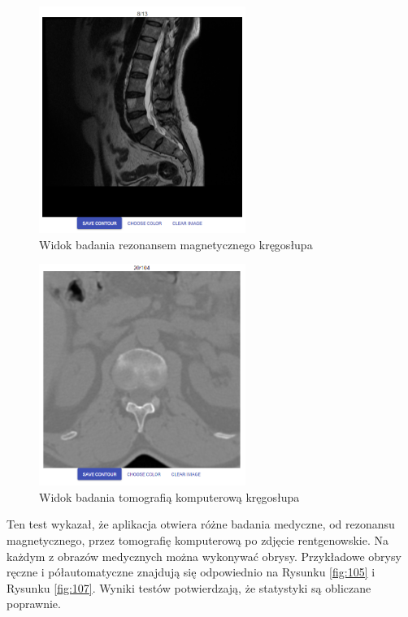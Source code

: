 \documentclass[a4paper,11pt,twoside,openright]{report}
\theoremstyle{definition}
\begin{document}
\begin{figure}[p]
	\center
	\includegraphics[width=0.6\textwidth]{114}
	\caption{Widok badania rezonansem magnetycznego kręgosłupa}
    	\label{fig:114}
\end{figure}

\begin{figure}[p]
	\center
	\includegraphics[width=0.6\textwidth]{115}
	\caption{Widok badania tomografią komputerową kręgosłupa}
    	\label{fig:115}
\end{figure}

Ten test wykazał, że aplikacja otwiera różne badania medyczne, od rezonansu
magnetycznego, przez tomografię komputerową po zdjęcie rentgenowskie. Na każdym
z obrazów medycznych można wykonywać obrysy. Przykładowe obrysy ręczne i
półautomatyczne znajdują się odpowiednio na Rysunku \ref{fig:105} i Rysunku
\ref{fig:107}. Wyniki testów potwierdzają, że statystyki są obliczane poprawnie.
\end{document}
